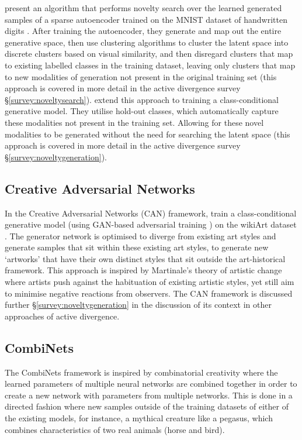 \citet{kazakcci2016digits} present an algorithm that performs novelty search over the learned generated samples of a sparse autoencoder trained on the MNIST dataset of handwritten digits \citep{lecun1998gradient}.
After training the autoencoder, they generate and map out the entire generative space, then use clustering algorithms to cluster the latent space into discrete clusters based on visual similarity, and then disregard clusters that map to existing labelled classes in the training dataset, leaving only clusters that map to new modalities of generation not present in the original training set (this approach is covered in more detail in the active divergence survey \S \ref{survey:noveltysearch}). 
\citep{cherti2017out} extend this approach to training a class-conditional generative model. 
They utilise hold-out classes, which automatically capture these modalities not present in the training set. 
Allowing for these novel modalities to be generated without the need for searching the latent space (this approach is covered in more detail in the active divergence survey \S \ref{survey:noveltygeneration}).   

\subsection{Creative Adversarial Networks}

In the Creative Adversarial Networks (CAN) framework, \cite{elgammal2017can} train a class-conditional generative model (using GAN-based adversarial training \citep{goodfellow2014generative}) on the wikiArt dataset \citep{saleh2016large}. 
The generator network is optimised to diverge from existing art styles and generate samples that sit within these existing art styles, to generate new `artworks' that have their own distinct styles that sit outside the art-historical framework.
This approach is inspired by Martinale's theory of artistic change \citep{martindale1990clockwork} where artists push against the habituation of existing artistic styles, yet still aim to minimise negative reactions from observers. 
The CAN framework is discussed further \S \ref{survey:noveltygeneration} in the discussion of its context in other approaches of active divergence. 

\subsection{CombiNets}

The CombiNets framework \citep{guzdial2018combinets} is inspired by combinatorial creativity  \citep{boden2004creative} where the learned parameters of multiple neural networks are combined together in order to create a new network with parameters from multiple networks.
This is done in a directed fashion where new samples outside of the training datasets of either of the existing models, for instance, a mythical creature like a pegasus, which combines characteristics of two real animals (horse and bird).

